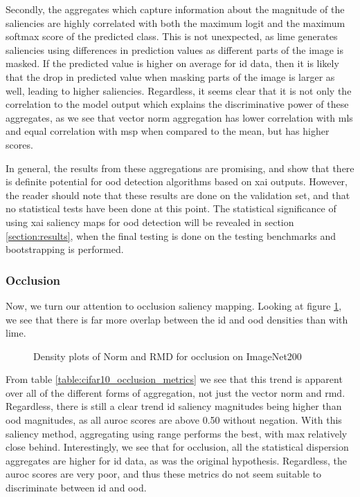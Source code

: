 \documentclass[UKenglish]{uiomasterthesis} %
\theoremstyle{definition}
\begin{document}
Secondly, the aggregates which capture information about the magnitude of the saliencies are highly correlated with both the maximum logit and the maximum softmax score of the predicted class. This is not unexpected, as \ac{lime} generates saliencies using differences in prediction values as different parts of the image is masked. If the predicted value is higher on average for \ac{id} data, then it is likely that the drop in predicted value when masking parts of the image is larger as well, leading to higher saliencies. Regardless, it seems clear that it is not only the correlation to the model output which explains the discriminative power of these aggregates, as we see that vector norm aggregation has lower correlation with \ac{mls} and equal correlation with \ac{msp} when compared to the mean, but has higher scores.

In general, the results from these aggregations are promising, and show that there is definite potential for \ac{ood} detection algorithms based on \ac{xai} outputs. However, the reader should note that these results are done on the validation set, and that no statistical tests have been done at this point. The statistical significance of using \ac{xai} saliency maps for \ac{ood} detection will be revealed in section \ref{section:results}, when the final testing is done on the testing benchmarks and bootstrapping is performed.

\subsubsection{Occlusion}

Now, we turn our attention to occlusion saliency mapping. Looking at figure \ref{fig:imagenet200_occlusion_mean_rmd}, we see that there is far more overlap between the \ac{id} and \ac{ood} densities than with \ac{lime}.

\begin{figure}[H]
    \begin{center}
        
    \end{center}
    \caption[Density plots of Norm and RMD for occlusion on ImageNet200]{Density plots of Norm and RMD for occlusion on ImageNet200}
    \label{fig:imagenet200_occlusion_mean_rmd}
\end{figure}

From table \ref{table:cifar10_occlusion_metrics} we see that this trend is apparent over all of the different forms of aggregation, not just the vector norm and \ac{rmd}. Regardless, there is still a clear trend \ac{id} saliency magnitudes being higher than \ac{ood} magnitudes, as all \ac{auroc} scores are above 0.50 without negation. With this saliency method, aggregating using range performs the best, with max relatively close behind. Interestingly, we see that for occlusion, all the statistical dispersion aggregates are higher for \ac{id} data, as was the original hypothesis. Regardless, the \ac{auroc} scores are very poor, and thus these metrics do not seem suitable to discriminate between \ac{id} and \ac{ood}.
\end{document}
